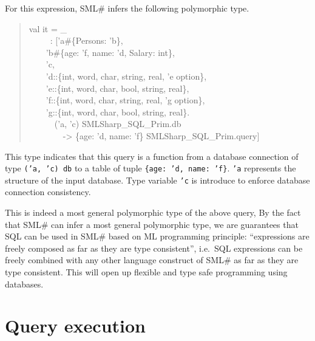 \documentclass{jbook}
\newcommand{\txt}[2]{#2}
\newcommand{\smlsharp}{SML\#}
\newcommand{\myem}{\mbox{\ \ }}
\newenvironment{program}{\begin{quote}\begin{tt}}%
                        {\end{tt}\end{quote}}
\begin{document}
	For this expression, \smlsharp{} infers the following
polymorphic type.
\begin{program}
val it = \_
\\\myem\ \ \   : ['a\#\{Persons: 'b\},
\\\myem\myem     'b\#\{age: 'f, name: 'd, Salary: int\},
\\\myem\myem     'c,
\\\myem\myem     'd::\{int, word, char, string, real, 'e option\},
\\\myem\myem     'e::\{int, word, char, bool, string, real\},
\\\myem\myem     'f::\{int, word, char, string, real, 'g option\},
\\\myem\myem     'g::\{int, word, char, bool, string, real\}.
\\\myem\myem\myem       ('a, 'c) SMLSharp\_SQL\_Prim.db
\\\myem\myem\myem\myem  -> \{age: 'd, name: 'f\} SMLSharp\_SQL\_Prim.query]
\end{program}
	This type indicates that this query is a function from a database
connection of type {\tt  ('a, 'c) db} to a table of tuple {\tt \{age: 'd,
name: 'f\}}.
	{\tt 'a} represents the structure of the input database.
	Type variable {\tt 'c} is introduce to enforce database
connection consistency.
	
	This is indeed a most general polymorphic type of the above
query,
	By the fact that \smlsharp{} can infer a most general
polymorphic type, we are guarantees that SQL can be used in \smlsharp{}
based on ML programming principle: ``expressions are freely
composed as far as they are type consistent'', i.e.\ 
SQL expressions can be freely combined with any other language construct
of \smlsharp{} as far as they are type consistent.
	This will open up flexible and type safe programming using
databases.

\fi%

\section{\txt{問い合わせの実行}{Query execution}}
\label{sec:tutorialExecutingSQL}
\end{document}
